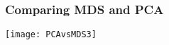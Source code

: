 \begin{frame}[fragile]
\frametitle{Comparing MDS and PCA}
\texttt{[image: PCAvsMDS3]}
\end{frame}
%
%
%
%
%
%
%
%
%
%
%
%         
%
%
%
%
%
%
%
%
%
%
%
